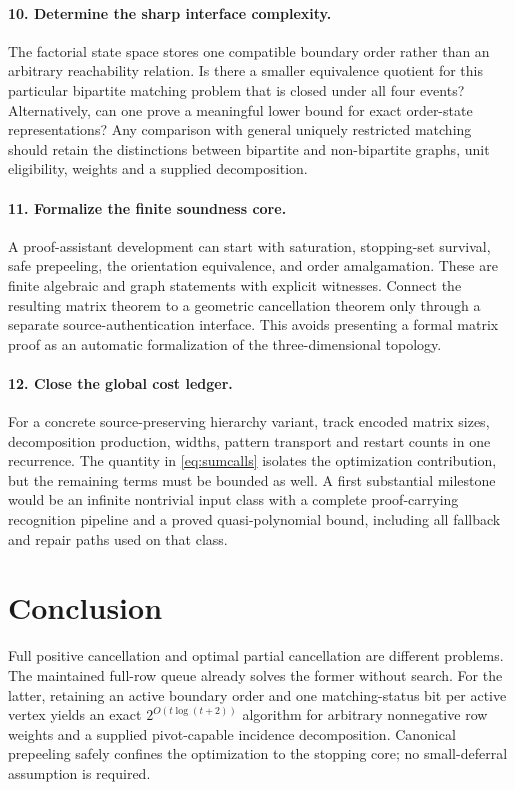 \documentclass[11pt]{article}
\theoremstyle{definition}\newtheorem{definition}[theorem]{Definition}
\theoremstyle{remark}\newtheorem{remark}[theorem]{Remark}
\begin{document}
\paragraph{10. Determine the sharp interface complexity.}
The factorial state space stores one compatible boundary order rather than an arbitrary reachability relation. Is there a smaller equivalence quotient for this particular bipartite matching problem that is closed under all four events? Alternatively, can one prove a meaningful lower bound for exact order-state representations? Any comparison with general uniquely restricted matching should retain the distinctions between bipartite and non-bipartite graphs, unit eligibility, weights and a supplied decomposition.

\paragraph{11. Formalize the finite soundness core.}
A proof-assistant development can start with saturation, stopping-set survival, safe prepeeling, the orientation equivalence, and order amalgamation. These are finite algebraic and graph statements with explicit witnesses. Connect the resulting matrix theorem to a geometric cancellation theorem only through a separate source-authentication interface. This avoids presenting a formal matrix proof as an automatic formalization of the three-dimensional topology.

\paragraph{12. Close the global cost ledger.}
For a concrete source-preserving hierarchy variant, track encoded matrix sizes, decomposition production, widths, pattern transport and restart counts in one recurrence. The quantity in \eqref{eq:sumcalls} isolates the optimization contribution, but the remaining terms must be bounded as well. A first substantial milestone would be an infinite nontrivial input class with a complete proof-carrying recognition pipeline and a proved quasi-polynomial bound, including all fallback and repair paths used on that class.

\section{Conclusion}
Full positive cancellation and optimal partial cancellation are different problems. The maintained full-row queue already solves the former without search. For the latter, retaining an active boundary order and one matching-status bit per active vertex yields an exact $2^{O(t\log(t+2))}$ algorithm for arbitrary nonnegative row weights and a supplied pivot-capable incidence decomposition. Canonical prepeeling safely confines the optimization to the stopping core; no small-deferral assumption is required.
\end{document}
